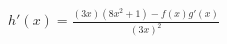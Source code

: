 \documentclass[preview]{standalone}
\begin{document}
\begin{align*}
h'(x) = \frac{(3x)(8x^2+1)-f(x)g'(x)}{(3x)^2}
\end{align*}
\end{document}
